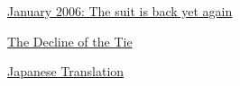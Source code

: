               
            
            
              
            
            
              
                
              
              
              
                \href{http://www.businessweek.com/bwdaily/dnflash/jan2006/nf20060120\_5808\_db035.htm}{January 2006: The suit is back yet again}


              
            
            
              
            
            
              
                
              
              
              
                \href{http://www.guardian.co.uk/commentisfree/story/0,,1864095,00.html}{The Decline of the Tie}


              
            
            
              
            
            
              
                
              
              
              
                \href{http://d.hatena.ne.jp/lionfan/20060114}{Japanese Translation}


              
            
          
